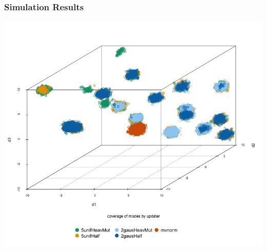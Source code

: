 \documentclass{beamer}\usepackage[]{graphicx}\usepackage[]{color}
\begin{document}
\begin{frame}
  \frametitle{Simulation Results}
  \vspace{-.6in}
  \centering
  \includegraphics[scale=0.35]{figure/final_plot.png}
\end{frame}
\end{document}
